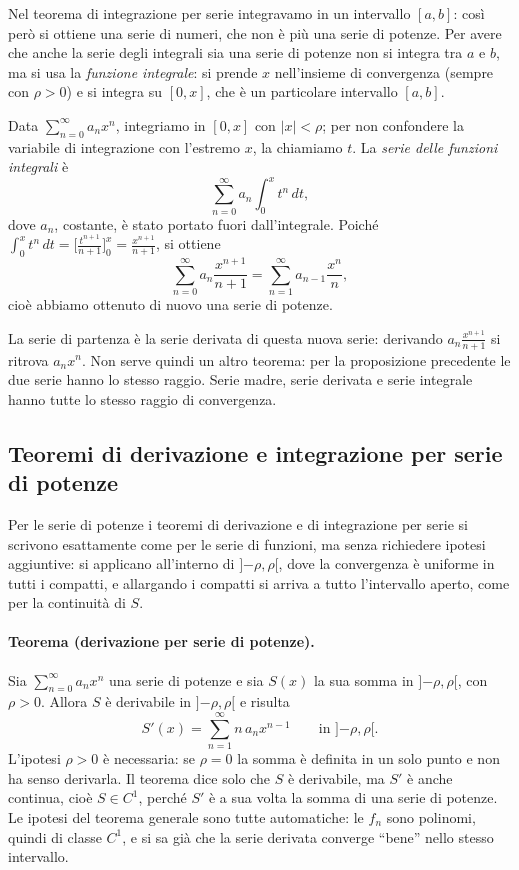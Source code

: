 Nel teorema di integrazione per serie integravamo in un intervallo $[a,b]$: così però si ottiene una serie di
numeri, che non è più una serie di potenze.
Per avere che anche la serie degli integrali sia una serie di potenze non si integra tra $a$ e $b$, ma si usa la
\emph{funzione integrale}: si prende $x$ nell'insieme di convergenza (sempre con $\rho>0$) e si integra su
$[0,x]$, che è un particolare intervallo $[a,b]$.

Data $\sum_{n=0}^{\infty} a_n x^n$, integriamo in $[0,x]$ con $|x|<\rho$; per non confondere la variabile di
integrazione con l'estremo $x$, la chiamiamo $t$. La \emph{serie delle funzioni integrali} è
\[
  \sum_{n=0}^{\infty} a_n \int_0^x t^n\,dt ,
\]
dove $a_n$, costante, è stato portato fuori dall'integrale. Poiché
$\int_0^x t^n\,dt = \bigl[\tfrac{t^{n+1}}{n+1}\bigr]_0^x = \tfrac{x^{n+1}}{n+1}$, si ottiene
\[
  \sum_{n=0}^{\infty} a_n \frac{x^{n+1}}{n+1} = \sum_{n=1}^{\infty} a_{n-1} \frac{x^n}{n} ,
\]
cioè abbiamo ottenuto di nuovo una serie di potenze.

La serie di partenza è la serie derivata di questa nuova serie: derivando $a_n \frac{x^{n+1}}{n+1}$ si ritrova
$a_n x^n$.
Non serve quindi un altro teorema: per la proposizione precedente le due serie hanno lo stesso raggio. Serie
madre, serie derivata e serie integrale hanno tutte lo stesso raggio di convergenza.

\subsection{Teoremi di derivazione e integrazione per serie di potenze}

Per le serie di potenze i teoremi di derivazione e di integrazione per serie si scrivono esattamente come per le
serie di funzioni, ma senza richiedere ipotesi aggiuntive: si applicano all'interno di $]{-\rho},\rho[$, dove la
convergenza è uniforme in tutti i compatti, e allargando i compatti si arriva a tutto l'intervallo aperto, come
per la continuità di $S$.

\paragraph{Teorema (derivazione per serie di potenze).}
Sia $\sum_{n=0}^{\infty} a_n x^n$ una serie di potenze e sia $S(x)$ la sua somma in $]{-\rho},\rho[$, con
$\rho>0$. Allora $S$ è derivabile in $]{-\rho},\rho[$ e risulta
\[
  S'(x) = \sum_{n=1}^{\infty} n\, a_n x^{n-1} \qquad \text{in } ]{-\rho},\rho[ .
\]
L'ipotesi $\rho>0$ è necessaria: se $\rho=0$ la somma è definita in un solo punto e non ha senso derivarla.
Il teorema dice solo che $S$ è derivabile, ma $S'$ è anche continua, cioè $S\in C^1$, perché $S'$ è a sua volta
la somma di una serie di potenze. Le ipotesi del teorema generale sono tutte automatiche: le $f_n$ sono
polinomi, quindi di classe $C^1$, e si sa già che la serie derivata converge ``bene'' nello stesso intervallo.

